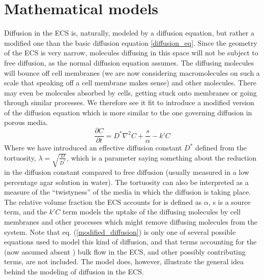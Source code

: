\documentclass[a4paper,english, 12pt, twoside]{article}
\renewcommand{\d}{\partial}
\begin{document}
\section{Mathematical models}
Diffusion in the ECS is, naturally, modeled by a diffusion equation, but rather a modified one than the basic diffusion equation \ref{diffusion_eq}. 
Since the geometry of the ECS is very narrow, molecules diffusing in this space will not be subject to free diffusion, as the normal diffusion equation assumes. 
The diffusing molecules will bounce off cell membranes (we are now considering macromolecules on such a scale that speaking off a cell membrane makes sense) and other molecules. 
There may even be molecules absorbed by cells, getting stuck onto membranes or going through similar processes. 
We therefore see it fit to introduce a modified version of the diffusion equation which is more similar to the one governing diffusion in porous media. 
\begin{equation}\label{modified_diffusion}
  \frac{\d C}{\d t} = D^*\nabla^2C +\frac{s}{\alpha} -k'C
\end{equation}
Where we have introduced an effective diffusion constant $D^*$ defined from the tortuosity, $\lambda = \sqrt{\frac{D}{D^*}}$, which is a parameter saying something about the reduction in the diffusion constant compared to free diffusion (usually measured in a low percentage agar solution in water). 
The tortuosity can also be interpreted as a measure of the ``twistyness'' of the media in which the diffusion is taking place. 
The relative volume fraction the ECS accounts for is defined as $\alpha$, s is a source term, and the $k'C$ term models the uptake of the diffusing molecules by cell membranes and other processes which might remove diffusing molecules from the system. 
Note that eq. (\ref{modified_diffusion}) is only one of several possible equations used to model this kind of diffusion, and that terms accounting for the (now assumed absent \cite{nicholson2001diffusion}) bulk flow in the ECS, and other possibly contributing terms, are not included. 
The model does, however, illustrate the general idea behind the modeling of diffusion in the ECS.
\end{document}
